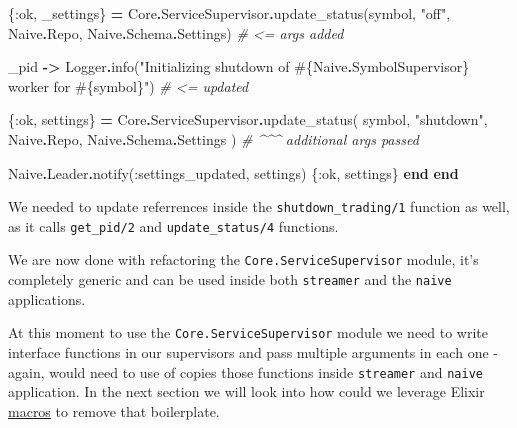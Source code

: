 \documentclass[
]{book}
\newenvironment{Shaded}{\begin{snugshade}}{\end{snugshade}}
\newcommand{\CommentTok}[1]{\textcolor[rgb]{0.56,0.35,0.01}{\textit{#1}}}
\newcommand{\ConstantTok}[1]{\textcolor[rgb]{0.00,0.00,0.00}{#1}}
\newcommand{\KeywordTok}[1]{\textcolor[rgb]{0.13,0.29,0.53}{\textbf{#1}}}
\newcommand{\NormalTok}[1]{#1}
\newcommand{\OperatorTok}[1]{\textcolor[rgb]{0.81,0.36,0.00}{\textbf{#1}}}
\newcommand{\OtherTok}[1]{\textcolor[rgb]{0.56,0.35,0.01}{#1}}
\newcommand{\StringTok}[1]{\textcolor[rgb]{0.31,0.60,0.02}{#1}}
\newcommand{\VariableTok}[1]{\textcolor[rgb]{0.00,0.00,0.00}{#1}}
\begin{document}
\begin{Shaded}
\begin{Highlighting}[]
\NormalTok{        \{}\VariableTok{:ok}\NormalTok{, \_settings\} }\OperatorTok{=}
          \ConstantTok{Core}\OperatorTok{.}\ConstantTok{ServiceSupervisor}\OperatorTok{.}\NormalTok{update\_status(symbol, }\StringTok{"off"}\NormalTok{, }\ConstantTok{Naive}\OperatorTok{.}\ConstantTok{Repo}\NormalTok{, }\ConstantTok{Naive}\OperatorTok{.}\ConstantTok{Schema}\OperatorTok{.}\ConstantTok{Settings}\NormalTok{) }\CommentTok{\# \textless{}= args added}

\NormalTok{      \_pid }\OperatorTok{{-}\textgreater{}}
        \ConstantTok{Logger}\OperatorTok{.}\NormalTok{info(}\StringTok{"Initializing shutdown of }\OtherTok{\#\{}\ConstantTok{Naive}\OperatorTok{.}\ConstantTok{SymbolSupervisor}\OtherTok{\}}\StringTok{ worker for }\OtherTok{\#\{}\NormalTok{symbol}\OtherTok{\}}\StringTok{"}\NormalTok{) }\CommentTok{\# \textless{}= updated}

\NormalTok{        \{}\VariableTok{:ok}\NormalTok{, settings\} }\OperatorTok{=}
          \ConstantTok{Core}\OperatorTok{.}\ConstantTok{ServiceSupervisor}\OperatorTok{.}\NormalTok{update\_status(}
\NormalTok{            symbol,}
            \StringTok{"shutdown"}\NormalTok{,}
            \ConstantTok{Naive}\OperatorTok{.}\ConstantTok{Repo}\NormalTok{,}
            \ConstantTok{Naive}\OperatorTok{.}\ConstantTok{Schema}\OperatorTok{.}\ConstantTok{Settings}
\NormalTok{          ) }\CommentTok{\# \^{}\^{}\^{} additional args passed}

        \ConstantTok{Naive}\OperatorTok{.}\ConstantTok{Leader}\OperatorTok{.}\NormalTok{notify(}\VariableTok{:settings\_updated}\NormalTok{, settings)}
\NormalTok{        \{}\VariableTok{:ok}\NormalTok{, settings\}}
    \KeywordTok{end}
  \KeywordTok{end}
\end{Highlighting}
\end{Shaded}

We needed to update referrences inside the \texttt{shutdown\_trading/1} function as well, as it calls \texttt{get\_pid/2} and \texttt{update\_status/4} functions.

We are now done with refactoring the \texttt{Core.ServiceSupervisor} module, it's completely generic and can be used inside both \texttt{streamer} and the \texttt{naive} applications.

At this moment to use the \texttt{Core.ServiceSupervisor} module we need to write interface functions in our supervisors and pass multiple arguments in each one - again, would need to use of copies those functions inside \texttt{streamer} and \texttt{naive} application. In the next section we will look into how could we leverage Elixir \href{https://elixir-lang.org/getting-started/meta/macros.html}{macros} to remove that boilerplate.
\end{document}
